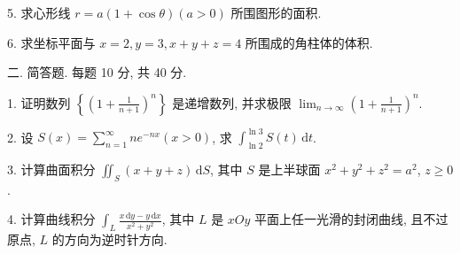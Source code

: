 \documentclass{examcollection}
\begin{document}
{\begin{minipage}{\textwidth}
5. 求心形线 $r = a(1 + \cos \theta) (a > 0)$ 所围图形的面积.\par
6. 求坐标平面与 $x = 2, y = 3, x + y + z = 4$ 所围成的角柱体的体积.\par
二. 简答题. 每题 10 分, 共 40 分.\par
1. 证明数列 $\left\{\left(1 + \frac{1}{n + 1}\right)^n\right\}$ 是递增数列, 并求极限 $\lim_{n\to \infty}\left(1 + \frac{1}{n + 1}\right)^n.$\par
2. 设 $S(x) = \sum_{n=1}^{\infty} ne^{-nx} (x > 0)$, 求 $\int_{\ln 2}^{\ln 3} S(t) \, \mathrm{d}t$.\par
3. 计算曲面积分 $\iint_{S} (x + y + z) \, \mathrm{d}S$, 其中 $S$ 是上半球面 $x^{2} + y^{2} + z^{2} = a^{2}$, $z \geq 0$.\par
4. 计算曲线积分 $\int_{L} \frac{x \, \mathrm{d}y - y \, \mathrm{d}x}{x^2 + y^2}$, 其中 $L$ 是 $xOy$ 平面上任一光滑的封闭曲线, 且不过原点, $L$ 的方向为逆时针方向.\par
\end{minipage}}
\ifdim\dimexpr\ht\proofbox+\dp\proofbox\relax>\textheight
\noindent\resizebox{!}{\textheight}{\usebox{\proofbox}}\else\noindent\usebox{\proofbox}\fi\clearpage
\end{document}
